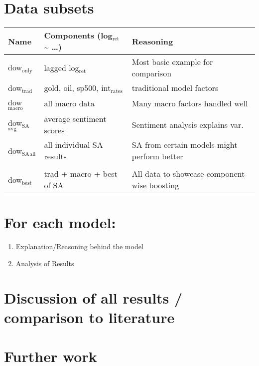 \documentclass{article}
\begin{document}
\section{Data subsets}
\label{sec-6}

\begin{center}
\begin{tabular}{lll}
Name & Components (log$_{\text{ret}}$ \textasciitilde{} \ldots{}) & Reasoning\\
\hline
dow$_{\text{only}}$ & lagged log$_{\text{ret}}$ & Most basic example for comparison\\
dow$_{\text{trad}}$ & gold, oil, sp500, int$_{\text{rates}}$ & traditional model factors\\
dow$_{\text{macro}}$ & all macro data & Many macro factors handled well\\
dow$_{\text{SA}}$$_{\text{avg}}$ & average sentiment scores & Sentiment analysis explains var.\\
dow$_{\text{SA}}$$_{\text{all}}$ & all individual SA results & SA from certain models might perform better\\
 &  & \\
\hline
dow$_{\text{best}}$ & trad + macro + best of SA & All data to showcase component-wise boosting\\
\hline
\end{tabular}
\end{center}


\section{For each model:}
\label{sec-7}

\begin{enumerate}
\item Explanation/Reasoning behind the model
\label{sec-7-1}

\item Analysis of Results
\label{sec-7-2}
\end{enumerate}


\section{Discussion of all results / comparison to literature}
\label{sec-8}

\section{Further work}
\label{sec-9}
\end{document}
